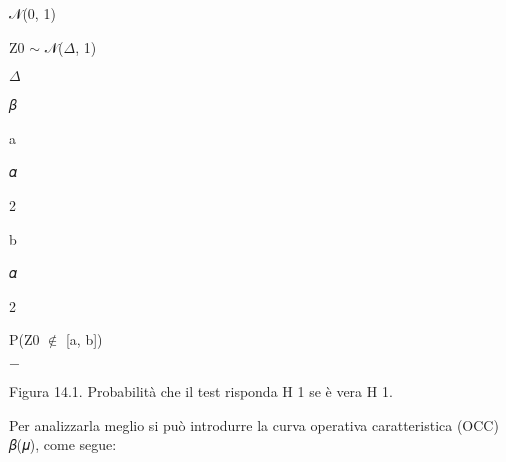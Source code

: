 \documentclass[a4paper,portrait,12pt]{article}
\begin{document}
\begin{flushleft}
𝒩(0, 1)
\end{flushleft}





\begin{flushleft}
Z0 $\sim$ 𝒩($\Delta$, 1)
\end{flushleft}





\begin{flushleft}
$\Delta$
\end{flushleft}





\begin{flushleft}
𝛽
\end{flushleft}


\begin{flushleft}
a
\end{flushleft}





\begin{flushleft}
𝛼
\end{flushleft}


2





\begin{flushleft}
b
\end{flushleft}





\begin{flushleft}
𝛼
\end{flushleft}


2





\begin{flushleft}
P(Z0 $\notin$ [a, b])
\end{flushleft}





$-$


\begin{flushleft}
Figura 14.1. Probabilit\`{a} che il test risponda H 1 se \`{e} vera H 1.
\end{flushleft}





\begin{flushleft}
Per analizzarla meglio si pu\`{o} introdurre la curva operativa caratteristica (OCC) 𝛽(𝜇), come segue:
\end{flushleft}
\end{document}
